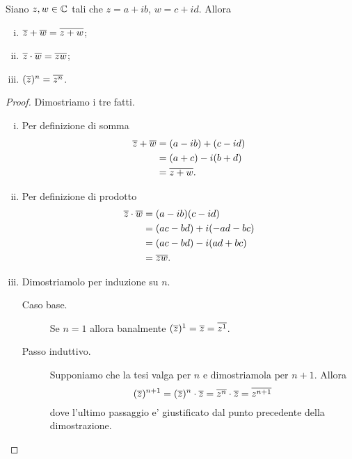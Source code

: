 \begin{proposition}\label{somma_prodotto_tra_coniugati}
    Siano $z, w \in \mathbb{C}$ tali che $z = a+ib$, $w = c + id$. Allora \begin{enumerate}[(i)]
        \item $\overline{z} + \overline{w} = \overline{z + w}$;
        \item $\overline{z}\cdot\overline{w} = \overline{zw}$;
        \item $(\overline{z})^n = \overline{z^n}$.
    \end{enumerate}
\end{proposition}
\begin{proof}
    Dimostriamo i tre fatti.
    \begin{enumerate}[(i)]
        \item Per definizione di somma \begin{alignat*}
            {1}
            \overline{z} + \overline{w} &= (a-ib) + (c - id)\\
            &= (a+c) - i(b+d)\\
            &= \overline{z + w}.
        \end{alignat*}
        \item Per definizione di prodotto \begin{alignat*}
            {1}
            \overline{z}\cdot\overline{w} &= (a-ib)(c - id)\\
            &= (ac - bd) + i(-ad-bc)\\
            &= (ac - bd) - i(ad+bc)\\
            &= \overline{zw}.
        \end{alignat*}
        \item Dimostriamolo per induzione su $n$.
        \begin{description}
            \item[Caso base.] Se $n = 1$ allora banalmente $(\overline{z})^1 = \overline{z} = \overline{z^1}$.
            \item[Passo induttivo.] Supponiamo che la tesi valga per $n$ e dimostriamola per $n+1$. Allora \[
                (\overline{z})^{n+1} = (\overline{z})^{n} \cdot \overline{z} = \overline{z^n} \cdot \overline{z} = \overline{z^{n+1}}
            \] dove l'ultimo passaggio e' giustificato dal punto precedente della dimostrazione. \qedhere
        \end{description}
    \end{enumerate}
\end{proof}

